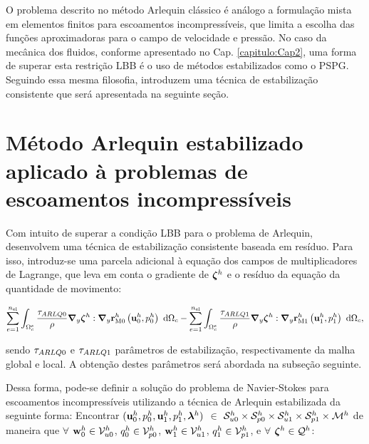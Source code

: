 O problema descrito no método Arlequin clássico é análogo a formulação mista em elementos finitos para escoamentos incompressíveis, que limita a escolha das funções aproximadoras para o campo de velocidade e pressão. No caso da mecânica dos fluidos, conforme apresentado no Cap. \ref{capitulo:Cap2}, uma forma de superar esta restrição LBB é o uso de métodos estabilizados como o PSPG. Seguindo essa mesma filosofia,   introduzem uma técnica de estabilização consistente que será apresentada na seguinte seção. 

\section{Método Arlequin estabilizado aplicado à problemas de escoamentos incompressíveis}

Com intuito de superar a condição LBB para o problema de Arlequin,  desenvolvem uma técnica de estabilização consistente baseada em resíduo. Para isso, introduz-se uma parcela adicional à equação dos campos de multiplicadores de Lagrange, que leva em conta o gradiente de $\boldsymbol{\zeta}^h$ e o resíduo da equação da quantidade de movimento:

\begin{align}
	\sum_{e=1}^{n_{\mathrm{el}}} \int_{\Omega^e_{c}} \frac{\tau_{ARLQ0}}{\rho} \boldsymbol{\nabla}_y \boldsymbol{\zeta}^h : \boldsymbol{\nabla}_y \mathbf{r}_{\mathrm{M0}}^{h}\left(\mathbf{u}_0^h,p_0^h \right) \ \mathrm{d} \Omega_c - 
	\sum_{e=1}^{n_{\mathrm{el}}} \int_{\Omega^e_{c}} \frac{\tau_{ARLQ1}}{\rho} \boldsymbol{\nabla}_y \boldsymbol{\zeta}^h : \boldsymbol{\nabla}_y \mathbf{r}_{\mathrm{M1}}^{h}\left(\mathbf{u}_1^h,p_1^h \right) \ \mathrm{d} \Omega_c,
\end{align}

\noindent sendo $\tau_{ARLQ0}$ e $\tau_{ARLQ1}$ parâmetros de estabilização, respectivamente da malha global e local. A obtenção destes parâmetros será abordada na subseção seguinte. 

Dessa forma, pode-se definir a solução do problema de Navier-Stokes para escoamentos incompressíveis utilizando a técnica de Arlequin estabilizada da seguinte forma: Encontrar $(\mathbf{u}_0^h,p_0^h,\mathbf{u}_1^h,p_1^h,\boldsymbol{\lambda}^h)$ $\in$ $\mathcal{S}_{u0}^h \times \mathcal{S}_{p0}^h \times \mathcal{S}_{u1}^h \times \mathcal{S}_{p1}^h \times \mathcal{M}^h$ de maneira que  $\forall$ $\mathbf{w}_0^h \in \mathcal{V}_{u0}^h$, $q_0^h \in \mathcal{V}_{p0}^h$, $\mathbf{w}_1^h \in \mathcal{V}_{u1}^h$, $q_1^h \in \mathcal{V}_{p1}^h$,   e $\forall$ $\boldsymbol{\zeta}^h \in \mathcal{Q}^h$:


